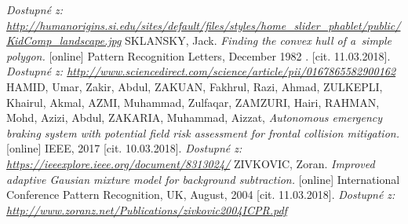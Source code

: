 \begin{thebibliography}{99}
	 \textit{Dostupné z: \url{http://humanorigins.si.edu/sites/default/files/styles/home_slider_phablet/public/KidComp_landscape.jpg}}
	SKLANSKY, Jack. \textit{Finding the convex hull of a~simple polygon.} [online] Pattern Recognition Letters, December 1982 . [cit. 11.03.2018].
		\textit{Dostupné z: \url{http://www.sciencedirect.com/science/article/pii/0167865582900162}}
	 HAMID, Umar, Zakir, Abdul, ZAKUAN, Fakhrul, Razi, Ahmad, ZULKEPLI, Khairul, Akmal, AZMI, Muhammad, Zulfaqar, ZAMZURI, Hairi, RAHMAN, Mohd, Azizi, Abdul, ZAKARIA, Muhammad, Aizzat, \textit{Autonomous emergency braking system with potential field risk assessment for frontal collision mitigation.} [online] IEEE, 2017 [cit. 10.03.2018].
		\textit{Dostupné z: \url{https://ieeexplore.ieee.org/document/8313024/}}
	ZIVKOVIC, Zoran. \textit{Improved adaptive Gausian mixture model for background subtraction.} [online] International Conference Pattern Recognition, UK, August, 2004 [cit. 11.03.2018].
		\textit{Dostupné z: \url{http://www.zoranz.net/Publications/zivkovic2004ICPR.pdf}}

\end{thebibliography}
